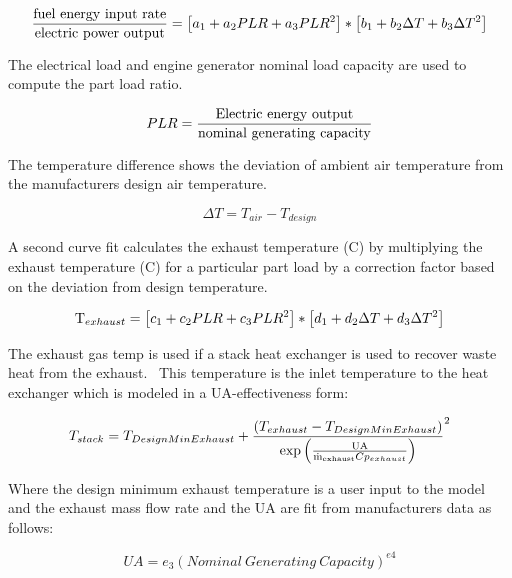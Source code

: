 \begin{equation}
\frac{{{\rm{fuel~energy~input~rate}}}}{{{\rm{electric~power~output}}}} = \left[ {{a_1} + {a_2}PLR + {a_3}PL{R^2}} \right] * \left[ {{b_1} + {b_2}\Delta T + {b_3}\Delta {T^2}} \right]
\end{equation}

The electrical load and engine generator nominal load capacity are used to compute the part load ratio.

\begin{equation}
PLR = \frac{{{\rm{Electric~energy~output}}}}{{{\rm{nominal~generating~capacity}}}}
\end{equation}

The temperature difference shows the deviation of ambient air temperature from the manufacturers design air temperature.

\begin{equation}
\Delta T = {T_{air}} - {T_{design}}
\end{equation}

A second curve fit calculates the exhaust temperature (C) by multiplying the exhaust temperature (C) for a particular part load by a correction factor based on the deviation from design temperature.

\begin{equation}
{{\rm{T}}_{exhaust}} = \left[ {{c_1} + {c_2}PLR + {c_3}PL{R^2}} \right] * \left[ {{d_1} + {d_2}\Delta T + {d_3}\Delta {T^2}} \right]
\end{equation}

The exhaust gas temp is used if a stack heat exchanger is used to recover waste heat from the exhaust.~ This temperature is the inlet temperature to the heat exchanger which is modeled in a UA-effectiveness form:

\begin{equation}
{T_{stack}} = {T_{DesignMinExhaust}} + {\frac{{\left( {{T_{exhaust}} - {T_{DesignMinExhaust}}} \right)}}{{{\rm{exp}}\left( {\frac{{{\rm{UA}}}}{{{{{\rm{\dot m}}}_{{\rm{exhaust}}}}C{p_{exhaust}}}}} \right)}}^2}
\end{equation}

Where the design minimum exhaust temperature is a user input to the model and the exhaust mass flow rate and the UA are fit from manufacturers data as follows:

\begin{equation}
UA = {e_3}{{(Nominal~Generating~Capacity)}^{e4}}
\end{equation}

